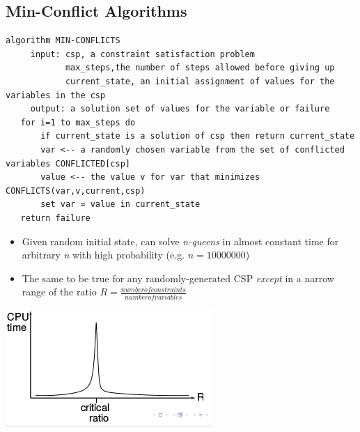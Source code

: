 \subsection{Min-Conflict Algorithms}
\begin{lstlisting}
algorithm MIN-CONFLICTS
     input: csp, a constraint satisfaction problem
            max_steps,the number of steps allowed before giving up
            current_state, an initial assignment of values for the variables in the csp
     output: a solution set of values for the variable or failure
   for i=1 to max_steps do
       if current_state is a solution of csp then return current_state
       var <-- a randomly chosen variable from the set of conflicted variables CONFLICTED[csp]
       value <-- the value v for var that minimizes CONFLICTS(var,v,current,csp)
       set var = value in current_state
   return failure
\end{lstlisting}

\begin{itemize}
\item Given random initial state, can solve \textit{n-queens} in almost constant time for arbitrary \textit{n} with high probability (e.g. $n = 10 000 000$)
\item The same to be true for any randomly-generated CSP \textit{except} in a narrow range of the ratio $R=\frac{number of constraints}{number of variables}$
\end{itemize}
\includegraphics[scale=1]{chap1_pics/minconfliggraph.png} 
